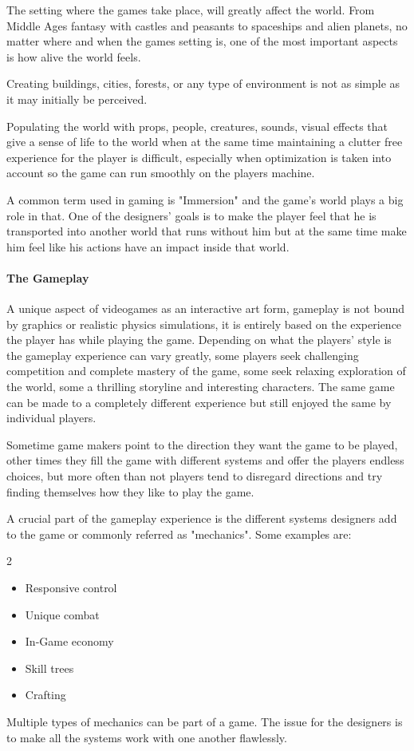 \documentclass[a4paper,one side,12pt]{book}
\begin{document}
The setting where the games take place, will greatly affect the world.
From Middle Ages fantasy with castles and peasants to spaceships and
alien planets, no matter where and when the game\textquotesingle s
setting is, one of the most important aspects is how alive the world
feels.

Creating buildings, cities, forests, or any type of environment is not
as simple as it may initially be perceived.

Populating the world with props, people, creatures, sounds, visual
effects that give a sense of life to the world when at the same time
maintaining a clutter free experience for the player is difficult,
especially when optimization is taken into account so the game can run
smoothly on the players machine.

A common term used in gaming is "Immersion" and the
game's world plays a big role in that. One of the
designers' goals is to make the player feel that he is
transported into another world that runs without him but at the same
time make him feel like his actions have an impact inside that world.


\paragraph{The Gameplay\\}

A unique aspect of videogames as an interactive art form, gameplay is
not bound by graphics or realistic physics simulations, it is entirely
based on the experience the player has while playing the game. Depending
on what the players' style is the gameplay experience
can vary greatly, some players seek challenging competition and complete
mastery of the game, some seek relaxing exploration of the world, some a
thrilling storyline and interesting characters. The same game can be
made to a completely different experience but still enjoyed the same by
individual players.

Sometime game makers point to the direction they want the game to be
played, other times they fill the game with different systems and offer
the players endless choices, but more often than not players tend to
disregard directions and try finding themselves how they like to play
the game.

A crucial part of the gameplay experience is the different systems
designers add to the game or commonly referred as "mechanics". Some
examples are:
\begin{multicols}{2}
\begin{itemize}
\item
  Responsive control
\item
  Unique combat
\item
  In-Game economy
\item
  Skill trees
\item
  Crafting
\end{itemize}
\end{multicols}
Multiple types of mechanics can be part of a game. The issue for the
designers is to make all the systems work with one another flawlessly.
\end{document}
